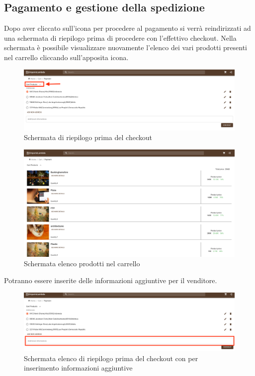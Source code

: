 \subsection{Pagamento e gestione della spedizione}
Dopo aver cliccato sull'icona per procedere al pagamento si verrà reindirizzati ad una schermata di riepilogo prima di procedere con l'effettivo checkout.
Nella schermata è possibile visualizzare nuovamente l'elenco dei vari prodotti presenti nel carrello cliccando sull'apposita icona.
\begin{figure}[H]
	\centering
	\includegraphics[scale=0.25]{Immagini/Acquirente/payment.cartproduct.png}
	\caption{Schermata di riepilogo prima del checkout}
	\label{fig:CartProduct}
\end{figure}
\begin{figure}[H]
	\centering
	\includegraphics[scale=0.25]{Immagini/Acquirente/payment-products-open.customer.png}
	\caption{Schermata elenco prodotti nel carrello}
	\label{fig:CartProductElenco}
\end{figure}
Potranno essere inserite delle informazioni aggiuntive per il venditore.
\begin{figure}[H]
	\centering
	\includegraphics[scale=0.25]{Immagini/Acquirente/payment.addinfo.png}
	\caption{Schermata elenco di riepilogo prima del checkout con  per inserimento informazioni aggiuntive}
	\label{fig:CartAddinfo}
\end{figure}

